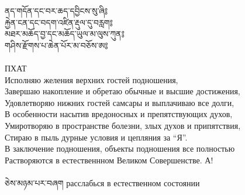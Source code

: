 ནད་གདོན་དང་བར་ཆད་དབྱིངས་སུ་ཞི༔\\
རྐྱེན་ངན་དང་བདག་འཛིན་རྡུལ་དུ་བརླག༔\\
མཐར་མཆོད་བྱ་དང་མཆོད་ཡུལ་མ་ལུས་ཀུན༔\\
གཤིས་རྫོགས་པ་ཆེན་པོར་མ་བཅོས་ཨ༔\\
\\
\ru
ПХАТ\\
Исполняю желения верхних гостей подношения,\\
Завершаю накопление и обретаю обычные и высшие достижения,\\
Удовлетворяю нижних гостей самсары и выплачиваю все долги,\\
В особенности насытив вредоносных и препятствующих духов,\\
Умиротворяю в пространстве болезни, злых духов и припятствия,\\
Стираю в пыль дурные условия и цепляния за “Я”.\\
В заключение подношения, объекты подношения все полностью\\
Растворяются в естественнном Великом Совершенстве. А!\\
\\
\ti
ཅེས་མཉམ་པར་བཞག \ru расслабься в естественном состоянии

